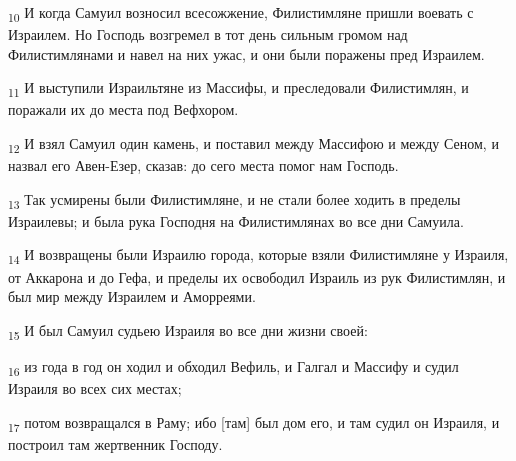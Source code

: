 \begin{tcolorbox}
\textsubscript{10} И когда Самуил возносил всесожжение, Филистимляне пришли воевать с Израилем. Но Господь возгремел в тот день сильным громом над Филистимлянами и навел на них ужас, и они были поражены пред Израилем.
\end{tcolorbox}
\begin{tcolorbox}
\textsubscript{11} И выступили Израильтяне из Массифы, и преследовали Филистимлян, и поражали их до места под Вефхором.
\end{tcolorbox}
\begin{tcolorbox}
\textsubscript{12} И взял Самуил один камень, и поставил между Массифою и между Сеном, и назвал его Авен-Езер, сказав: до сего места помог нам Господь.
\end{tcolorbox}
\begin{tcolorbox}
\textsubscript{13} Так усмирены были Филистимляне, и не стали более ходить в пределы Израилевы; и была рука Господня на Филистимлянах во все дни Самуила.
\end{tcolorbox}
\begin{tcolorbox}
\textsubscript{14} И возвращены были Израилю города, которые взяли Филистимляне у Израиля, от Аккарона и до Гефа, и пределы их освободил Израиль из рук Филистимлян, и был мир между Израилем и Аморреями.
\end{tcolorbox}
\begin{tcolorbox}
\textsubscript{15} И был Самуил судьею Израиля во все дни жизни своей:
\end{tcolorbox}
\begin{tcolorbox}
\textsubscript{16} из года в год он ходил и обходил Вефиль, и Галгал и Массифу и судил Израиля во всех сих местах;
\end{tcolorbox}
\begin{tcolorbox}
\textsubscript{17} потом возвращался в Раму; ибо [там] был дом его, и там судил он Израиля, и построил там жертвенник Господу.
\end{tcolorbox}
